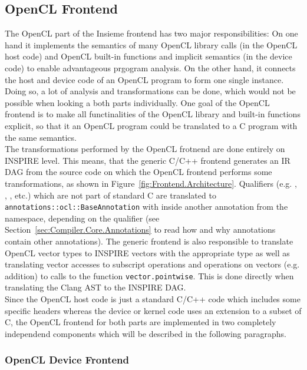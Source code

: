 \subsection{OpenCL Frontend}
\label{sec:Insieme.OpenCL}

The OpenCL part of the Insieme frontend has two major responsibilities: On one hand it implements the semantics of many OpenCL library calls (in the OpenCL host code) and OpenCL built-in functions and implicit semantics (in the device code) to enable advantageous prgogram analysis. On the other hand, it connects the host and device code of an OpenCL program to form one single instance. Doing so, a lot of analysis and transformations can be done, which would not be possible when looking a both parts individually. One goal of the OpenCL frontend is to make all functinalities of the OpenCL library and built-in functions explicit, so that it an OpenCL program could be translated to a C program with the same semantics. \\

The transformations performed by the OpenCL frotnend are done entirely on INSPIRE level. This means, that the generic C/C++ frontend generates an IR DAG from the source code on which the OpenCL frontend performs some transformations, as shown in Figure~\ref{fig:Frontend.Architecture}. Qualifiers (e.g. , , , etc.) which are not part of standard C are translated to \texttt{annotations::ocl::BaseAnnotation} with inside another annotation from the  namespace, depending on the qualifier (see Section~\ref{sec:Compiler.Core.Annotations} to read how and why annotations contain other annotations). The generic frontend is also responsible to translate OpenCL vector types to INSPIRE vectors with the appropriate type as well as translating vector accesses to subscript operations and operations on vectors (e.g. addition) to calls to the function \texttt{vector.pointwise}. This is done directly when translating the Clang AST to the INSPIRE DAG. \\

Since the OpenCL host code is just a standard C/C++ code which includes some specific headers whereas the device or kernel code uses an extension to a subset of C, the OpenCL frontend for both parts are implemented in two completely independend components which will be described in the following paragraphs. \\


\subsubsection{OpenCL Device Frontend}
\label{sec:Insieme.DeviceCL}

